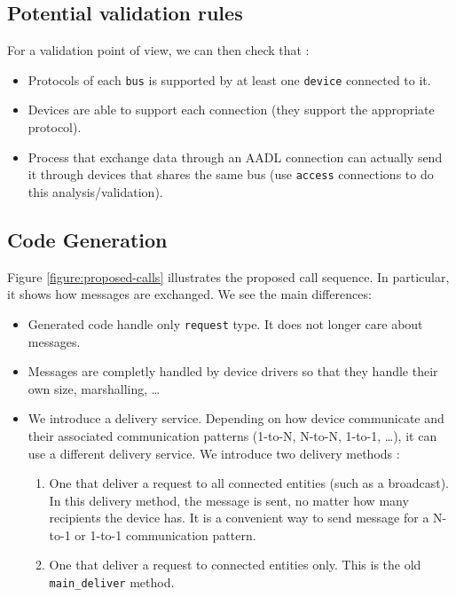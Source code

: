 \documentclass[11pt]{article}
\newcommand{\Concept}[1]{#1\xspace}
\newcommand{\aadl}{\Concept{AADL}}
\begin{document}
   \subsection{Potential validation rules}
   For a validation point of view, we can then check that :
   \begin{itemize}
      \item
         Protocols of each \texttt{bus} is supported by at least one
         \texttt{device} connected to it.
      \item
         Devices are able to support each connection (they support the
         appropriate protocol).
      \item
         Process that exchange data through an \aadl connection can actually send 
         it through devices that shares the same bus (use \texttt{access}
         connections to do this analysis/validation).
   \end{itemize}


   \subsection{Code Generation}
   Figure \ref{figure:proposed-calls} illustrates the proposed call sequence. In
   particular, it shows how messages are exchanged. We see the main differences:
   \begin{itemize}
      \item
         Generated code handle only \texttt{request} type. It does not longer
         care about messages.
      \item
         Messages are completly handled by device drivers so that they handle
         their own size, marshalling, \ldots
      \item
         We introduce a delivery service. Depending on how device communicate
         and their associated communication patterns (1-to-N, N-to-N, 1-to-1, 
         \ldots), it can use a different delivery service. We introduce two
         delivery methods :
         \begin{enumerate}
            \item
               One that deliver a request to all connected entities (such as a
               broadcast). In this delivery method, the message is sent, no
               matter how many recipients the device has. It is a convenient way
               to send message for a N-to-1 or 1-to-1 communication pattern.
            \item
               One that deliver a request to connected entities only. This is
               the old \texttt{main\_deliver} method.
         \end{enumerate}
   \end{itemize}
\end{document}
